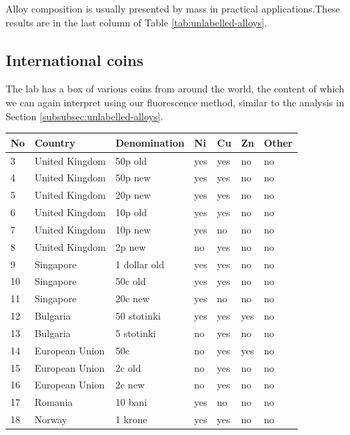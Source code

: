 \documentclass[11pt,a4paper,twoside,onecolumn]{article}
\begin{document}
Alloy composition is usually presented by mass in practical applications.These results are in the last column of Table \ref{tab:unlabelled-alloys}.

\subsection{International coins}
The lab has a box of various coins from around the world, the content of which we can again interpret using our fluorescence method, similar to the analysis in Section \ref{subsubsec:unlabelled-alloys}.

\begin{table}[!htbp]
    \centering
    \begin{tabular}{@{}lllllll@{}}
    \toprule
    No & Country        & Denomination   & Ni  & Cu  & Zn  & Other \\ \midrule
    3  & United Kingdom & 50p old        & yes & yes & no  & no    \\
    4  & United Kingdom & 50p new        & yes & yes & no  & no    \\
    5  & United Kingdom & 20p new        & yes & yes & no  & no    \\
    6  & United Kingdom & 10p old        & yes & yes & no  & no    \\
    7  & United Kingdom & 10p new        & yes & no  & no  & no    \\
    8  & United Kingdom & 2p new         & no  & yes & no  & no    \\
    9  & Singapore      & 1 dollar old   & yes & yes & no  & no    \\
    10 & Singapore      & 50c old        & yes & yes & no  & no    \\
    11 & Singapore      & 20c new        & yes & no  & no  & no    \\
    12 & Bulgaria       & 50 stotinki    & yes & yes & yes & no    \\
    13 & Bulgaria       & 5 stotinki     & no  & yes & no  & no    \\
    14 & European Union & 50c            & no  & yes & yes & no    \\
    15 & European Union & 2c old         & no  & yes & no  & no    \\
    16 & European Union & 2c new         & no  & yes & no  & no    \\
    17 & Romania        & 10 bani        & yes & no  & no  & no    \\
    18 & Norway         & 1 krone        & yes & yes & no  & no    \\

\end{tabular}
\end{table}
\end{document}
